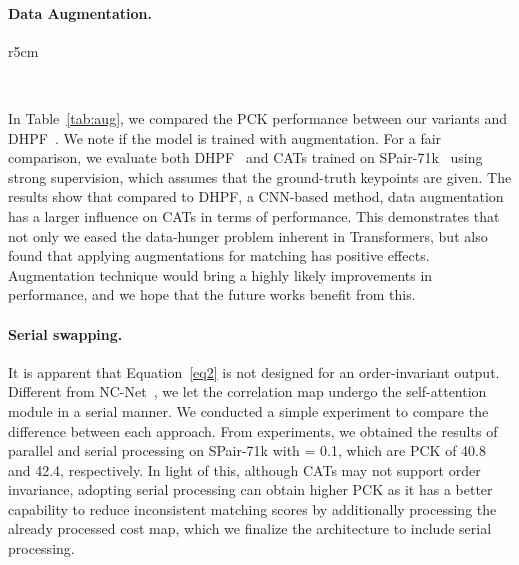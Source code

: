 \paragraph{Data Augmentation.}
\begin{wraptable}{r}{5cm}
\vspace{-7mm}
\caption{~\textbf{Effects of augmentation.}}
\label{tab:aug}\vspace{+5pt}
\centering
{} \\
\centering
\end{wraptable}
In Table~\ref{tab:aug}, we compared the PCK performance between our variants and DHPF~\cite{min2020learning}. We note if the model is trained with augmentation. For a fair comparison, we evaluate both DHPF~\cite{min2020learning} and CATs trained on SPair-71k~\cite{min2019spair} using strong supervision, which assumes that the ground-truth keypoints are given. The results show that compared to DHPF, a CNN-based method, data augmentation has a larger influence on CATs in terms of performance. This demonstrates that not only we eased the data-hunger problem inherent in Transformers, but also found that applying augmentations for matching has positive effects. Augmentation technique would bring a highly likely improvements in performance, and we hope that the future works benefit from this. 

\paragraph{Serial swapping.}
It is apparent that Equation~\ref{eq2} is not designed for an order-invariant output. Different from NC-Net~\cite{rocco2018neighbourhood}, we let the correlation map undergo the self-attention module in a serial manner. We conducted a simple experiment to compare the difference between each approach. From experiments, we obtained the results of parallel and serial processing on SPair-71k with  = 0.1, which are PCK of 40.8 and 42.4, respectively. In light of this, although CATs may not support order invariance, adopting serial processing can obtain higher PCK as it has a better capability to reduce inconsistent matching scores by additionally processing the already processed cost map, which we finalize the architecture to include serial processing.

